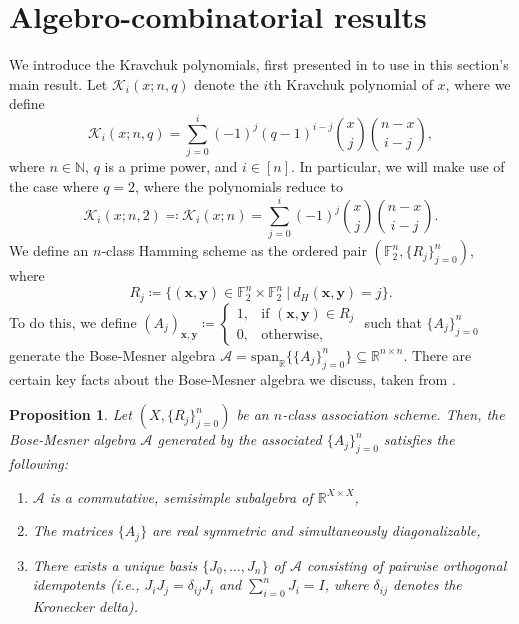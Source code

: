 \documentclass[12pt]{amsart}
\numberwithin{figure}{section}
\theoremstyle{plain}
\newtheorem{proposition}[theorem]{Proposition}
\begin{document}
\section{Algebro-combinatorial results}
\indent We introduce the Kravchuk polynomials, first presented in \cite{kravchuk1929} to use in this section's main result. Let $\mathcal{K}_{i}(x;n,q)$ denote the $i$th Kravchuk polynomial of $x$, where we define
\[\mathcal{K}_{i}(x;n, q) = \sum_{j=0}^{i}(-1)^{j}(q-1)^{i-j}\binom{x}{j}\binom{n-x}{i-j},\]
where $n\in\mathbb{N}$, $q$ is a prime power, and $i\in[n]$. In particular, we will make use of the case where $q=2$, where the polynomials reduce to
\[\mathcal{K}_{i}(x;n,2) \eqqcolon \mathcal{K}_{i}(x;n) = \sum_{j=0}^{i}(-1)^{j}\binom{x}{j}\binom{n-x}{i-j}.\]
\indent We define an $n$-class Hamming scheme as the ordered pair $(\mathbb{F}_{2}^{n}, \{R_{j}\}_{j=0}^{n})$, where 
\[R_{j}\coloneq \{(\mathbf{x},\mathbf{y})\in\mathbb{F}_{2}^{n}\times\mathbb{F}_{2}^{n}\:|\:d_{H}(\mathbf{x},\mathbf{y}) = j\}.\]
To do this, we define $(A_{j})_{\mathbf{x},\mathbf{y}}\coloneq
\begin{cases}
        1, & \text{if } (\mathbf{x}, \mathbf{y}) \in R_{j} \\
        0, & \text{otherwise,}
\end{cases}$
such that $\{A_{j}\}_{j=0}^{n}$ generate the Bose-Mesner algebra $\mathcal{A} = \mathrm{span}_{\mathbb{R}}\bigl\{\{A_{j}\}_{j=0}^{n}\bigr\}\subseteq\mathbb{R}^{n\times n}$. There are certain key facts about the Bose-Mesner algebra we discuss, taken from \cite{BI84}.
\begin{proposition}
    Let $(X, \{R_{j}\}_{j=0}^{n})$ be an $n$-class association scheme. Then, the Bose-Mesner algebra $\mathcal{A}$ generated by the associated $\{A_{j}\}_{j=0}^{n}$ satisfies the following:\normalfont
    \begin{enumerate}[label=(\roman*)]
        \item\textit{$\mathcal{A}$ is a commutative, semisimple subalgebra of $\mathbb{R}^{X \times X}$,}
        \item\textit{The matrices $\{A_{j}\}$ are real symmetric and simultaneously diagonalizable,}
        \item\textit{There exists a unique basis $\{J_{0}, \dots, J_{n}\}$ of $\mathcal{A}$ consisting of pairwise orthogonal idempotents (i.e., $J_{i} J_{j} = \delta_{ij} J_{i}$ and $\sum_{i=0}^{n} J_{i} = I$, where $\delta_{ij}$ denotes the Kronecker delta).}
    \end{enumerate}
\end{proposition}
\end{document}
